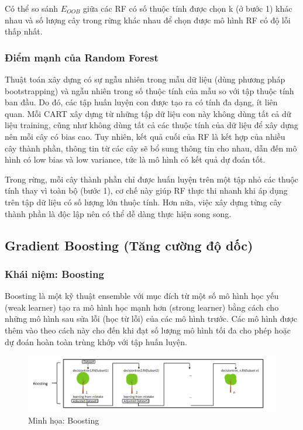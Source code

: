     Có thể so sánh $E_{OOB}$ giữa các RF có số thuộc tính được chọn k (ở bước 1) khác nhau và số lượng cây trong rừng khác nhau để chọn được mô hình RF có độ lỗi thấp nhất. 
    
    \subsubsection{Điểm mạnh của Random Forest}
    
    Thuật toán xây dựng có sự ngẫu nhiên trong mẫu dữ liệu (dùng phương pháp bootstrapping) và ngẫu nhiên trong số thuộc tính của mẫu so với tập thuộc tính ban đầu. Do đó, các tập huấn luyện con được tạo ra có tính đa dạng, ít liên quan. Mỗi CART xây dựng từ những tập dữ liệu con này không dùng tất cả dữ liệu training, cũng như không dùng tất cả các thuộc tính của dữ liệu để xây dựng nên mỗi cây có bias cao. Tuy nhiên, kết quả cuối của RF là kết hợp của nhiều cây thành phần, thông tin từ các cây sẽ bổ sung thông tin cho nhau, dẫn đến mô hình có low bias và low variance, tức là mô hình có kết quả dự đoán tốt.
    
    Trong rừng, mỗi cây thành phần chỉ được huấn luyện trên một tập nhỏ các thuộc tính thay vì toàn bộ (bước 1), cơ chế này giúp RF thực thi nhanh khi áp dụng trên tập dữ liệu có số lượng lớn thuộc tính. Hơn nữa, việc xây dựng từng cây thành phần là độc lập nên có thể dễ dàng thực hiện song song.


\subsection{Gradient Boosting (Tăng cường độ dốc)}
    \subsubsection{Khái niệm: Boosting}
        Boosting là một kỹ thuật ensemble với mục đích từ một số mô hình học yếu (weak learner) tạo ra mô hình học mạnh hơn (strong learner) bằng cách cho những mô hình sau sửa lỗi (học từ lỗi) của các mô hình trước. Các mô hình được thêm vào theo cách này cho đến khi đạt số lượng mô hình tối đa cho phép hoặc dự đoán hoàn toàn trùng khớp với tập huấn luyện.
        
        \begin{figure}[htp]
            \centering
            \includegraphics[width=16cm]{images/boosting.png}
            \caption{Minh họa: Boosting}
            \label{fig:boosting}
        \end{figure}
        
